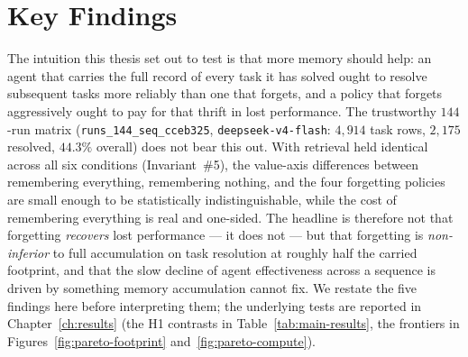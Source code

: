 

\section{Key Findings}

The intuition this thesis set out to test is that more memory should help: an agent
that carries the full record of every task it has solved ought to resolve subsequent
tasks more reliably than one that forgets, and a policy that forgets aggressively ought
to pay for that thrift in lost performance. The trustworthy $144$-run matrix
(\texttt{runs\_144\_seq\_cceb325}, \texttt{deepseek-v4-flash}: $4{,}914$ task rows,
$2{,}175$ resolved, $44.3\%$ overall) does not bear this out. With retrieval held
identical across all six conditions (Invariant~\#5), the value-axis differences between
remembering everything, remembering nothing, and the four forgetting policies are small
enough to be statistically indistinguishable, while the cost of remembering everything is
real and one-sided. The headline is therefore not that forgetting \emph{recovers} lost
performance --- it does not --- but that forgetting is \emph{non-inferior} to full
accumulation on task resolution at roughly half the carried footprint, and that the slow
decline of agent effectiveness across a sequence is driven by something memory
accumulation cannot fix. We restate the five findings here before interpreting them; the
underlying tests are reported in Chapter~\ref{ch:results} (the H1 contrasts in
Table~\ref{tab:main-results}, the frontiers in Figures~\ref{fig:pareto-footprint}
and~\ref{fig:pareto-compute}).

